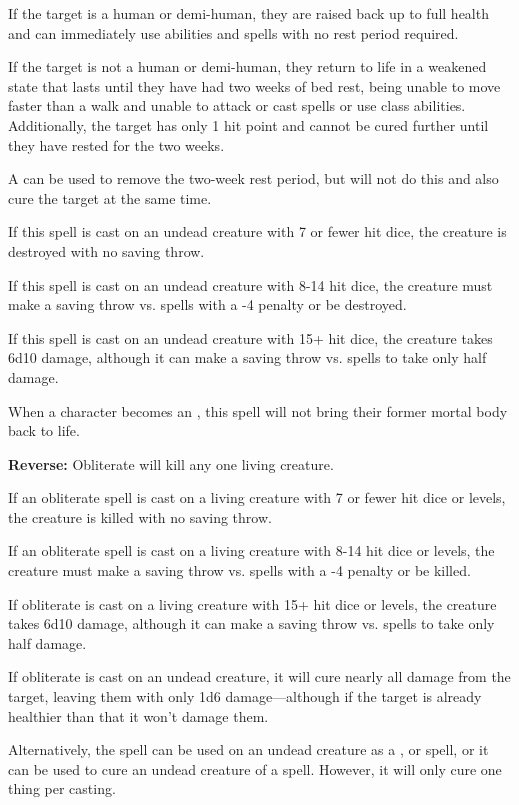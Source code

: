\begin{multicols*}{2}
If the target is a human or demi-human, they are raised back up to full health and can immediately use abilities and spells with no rest period required.

If the target is not a human or demi-human, they return to life in a weakened state that lasts until they have had two weeks of bed rest, being unable to move faster than a walk and unable to attack or cast spells or use class abilities. Additionally, the target has only 1 hit point and cannot be cured further until they have rested for the two weeks.

A  can be used to remove the two-week rest period, but will not do this and also cure the target at the same time.

If this spell is cast on an undead creature with 7 or fewer hit dice, the creature is destroyed with no saving throw.

If this spell is cast on an undead creature with 8-14 hit dice, the creature must make a saving throw vs. spells with a -4 penalty or be destroyed.

If this spell is cast on an undead creature with 15+ hit dice, the creature takes 6d10 damage, although it can make a saving throw vs. spells to take only half damage.

When a character becomes an , this spell will not bring their former mortal body back to life.

\textbf{Reverse:} \hypertarget{spell:Obliterate}{Obliterate} will kill any one living creature.

If an obliterate spell is cast on a living creature with 7 or fewer hit dice or levels, the creature is killed with no saving throw.

If an obliterate spell is cast on a living creature with 8-14 hit dice or levels, the creature must make a saving throw vs. spells with a -4 penalty or be killed.

If obliterate is cast on a living creature with 15+ hit dice or levels, the creature takes 6d10 damage, although it can make a saving throw vs. spells to take only half damage.

If obliterate is cast on an undead creature, it will cure nearly all damage from the target, leaving them with only 1d6 damage—although if the target is already healthier than that it won’t damage them.

Alternatively, the spell can be used on an undead creature as a ,  or  spell, or it can be used to cure an undead creature of a  spell. However, it will only cure one thing per casting.


\end{multicols*}
